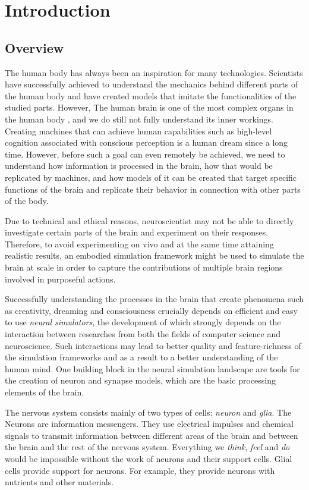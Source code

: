 \chapter{Introduction}

\section{Overview}


The human body has always been an inspiration for many technologies. Scientists have successfully achieved to understand the mechanics behind different parts of the human body and have created models that imitate the functionalities of the studied parts. However, The human brain is one of the most complex organs in the human body \citep{nolte2002human}, and we do still not fully understand its inner workings. Creating machines that can achieve human capabilities such as high-level cognition associated with conscious perception is a human dream since a long time. However, before such a goal can even remotely be achieved, we need to understand how information is processed in the brain, how that would be replicated by machines, and how models of it can be created that target specific functions of the brain and replicate their behavior in connection with other parts of the body. 

Due to technical and ethical reasons, neuroscientist may not be able to directly investigate certain parts of the brain and experiment on their responses. Therefore, to avoid experimenting on vivo and at the same time attaining realistic results, an embodied simulation framework \citep{10.3389/fninf.2022.884180} might be used to simulate the brain at scale in order to capture the contributions of multiple brain regions involved in purposeful actions.

Successfully understanding the processes in the brain that create phenomena such as creativity, dreaming and consciousness crucially depends on efficient and easy to use \emph{neural simulators}, the development of which strongly depends on the interaction between researches from both the fields of computer science and neuroscience. Such interactions may lead to better quality and feature-richness of the simulation frameworks and as a result to a better understanding of the human mind. One building block in the neural simulation landscape are tools for the creation of neuron and synapse models, which are the basic processing elements of the brain. 


The nervous system consists mainly of two types of cells: \emph{neuron} and \emph{glia}. The Neurons are information messengers. They use electrical impulses and chemical signals to transmit information between different areas of the brain and between the brain and the rest of the nervous system. Everything we \emph{think}, \emph{feel} and \emph{do} would be impossible without the work of neurons and their support cells. Glial cells provide support for neurons. For example, they provide neurons with nutrients and other materials.


